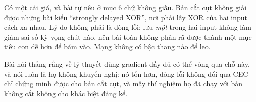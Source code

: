 %
Có một cái giá, và bài tự nêu ở mục 6 chứ không giấu. Bản cắt cụt không giải
được những bài kiểu \enquote{strongly delayed XOR}, nơi phải lấy XOR của hai
input cách xa nhau. Lý do không phải là dòng lỗi: lưu \emph{một} trong hai
input không làm giảm sai số kỳ vọng chút nào, nên bài toán không phân rã được
thành một mục tiêu con dễ hơn để bám vào. Mạng không có bậc thang nào để leo.

Bài nói thẳng rằng về lý thuyết dùng gradient đầy đủ có thể vòng qua chỗ này,
và nói luôn là họ không khuyến nghị: nó tốn hơn, dòng lỗi không đổi qua CEC chỉ
chứng minh được cho bản cắt cụt, và mấy thí nghiệm họ đã chạy với bản không cắt
không cho khác biệt đáng kể.
